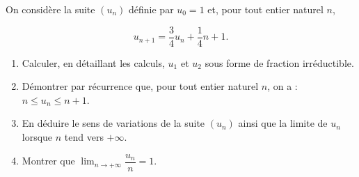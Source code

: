 \documentclass[11pt,fleqn, openany]{book} %
\begin{document}
\begin{exercise}[subtitle={(Métropole 2021)}]On considère la suite \((u_n)\) définie par \(u_0=1\) et, pour tout entier naturel \(n\),

\[u_{n+1}=\dfrac{3}{4}u_n+\dfrac{1}{4}n+1.\]
\begin{enumerate}
 	\item Calculer, en détaillant les calculs, \(u_1\) et \(u_2\) sous forme de fraction irréductible.
 	\item Démontrer par récurrence que, pour tout entier naturel \(n\), on a : \(n \leqslant u_n \leqslant n+1\).
 	\item En déduire le sens de variations de la suite \((u_n)\) ainsi que la limite de \(u_n\) lorsque \(n\) tend vers \(+\infty\).
 	\item Montrer que $\displaystyle\lim_{n \to +\infty} \dfrac{u_n}{n}=1$.
\end{enumerate}\end{exercise}
\end{document}
